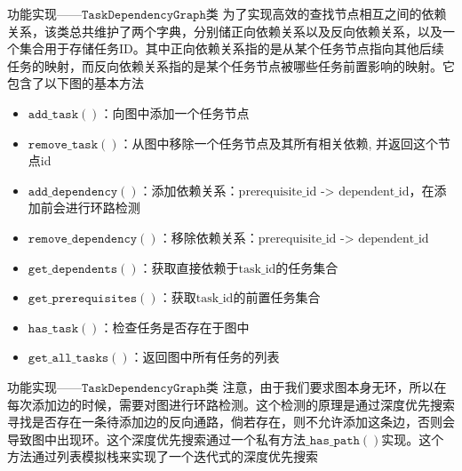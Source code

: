 \documentclass[aspectratio=169]{beamer}
\begin{document}
\begin{frame}{功能实现——$\mathtt{TaskDependencyGraph}$类}
    为了实现高效的查找节点相互之间的依赖关系，该类总共维护了两个字典，分别储正向依赖关系以及反向依赖关系，以及一个集合用于存储任务ID。其中正向依赖关系指的是从某个任务节点指向其他后续任务的映射，而反向依赖关系指的是某个任务节点被哪些任务前置影响的映射。它包含了以下图的基本方法
    \begin{itemize}
        \item $\mathtt{add\_task()}$：向图中添加一个任务节点
        \item $\mathtt{remove\_task()}$：从图中移除一个任务节点及其所有相关依赖, 并返回这个节点id
        \item $\mathtt{add\_dependency()}$：添加依赖关系：$\text{prerequisite\_id}$ -> $\text{dependent\_id}$，在添加前会进行环路检测
        \item $\mathtt{remove\_dependency()}$：移除依赖关系：$\text{prerequisite\_id}$ -> $\text{dependent\_id}$
        \item $\mathtt{get\_dependents()}$：获取直接依赖于$\text{task\_id}$的任务集合
        \item $\mathtt{get\_prerequisites()}$：获取$\text{task\_id}$的前置任务集合
        \item $\mathtt{has\_task()}$：检查任务是否存在于图中
        \item $\mathtt{get\_all\_tasks()}$：返回图中所有任务的列表
    \end{itemize}
\end{frame}

\begin{frame}{功能实现——$\mathtt{TaskDependencyGraph}$类}
    注意，由于我们要求图本身无环，所以在每次添加边的时候，需要对图进行环路检测。这个检测的原理是通过深度优先搜索寻找是否存在一条待添加边的反向通路，倘若存在，则不允许添加这条边，否则会导致图中出现环。这个深度优先搜索通过一个私有方法$\mathtt{\_has\_path()}$实现。这个方法通过列表模拟栈来实现了一个迭代式的深度优先搜索
\end{frame}
\end{document}
